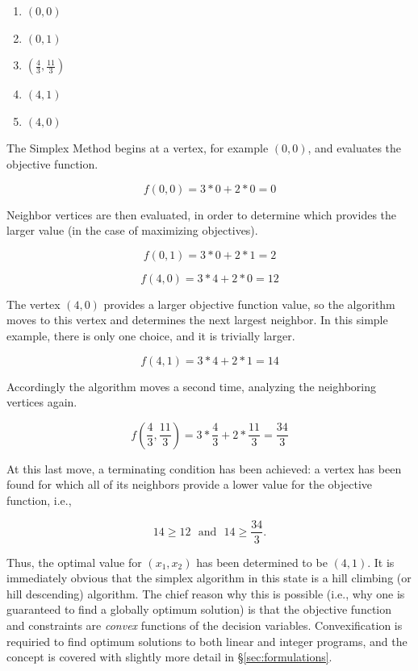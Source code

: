 \begin{enumerate}
  \item $(0, 0)$
  \item $(0, 1)$
  \item $(\frac{4}{3}, \frac{11}{3})$
  \item $(4, 1)$
  \item $(4, 0)$
\end{enumerate}

The Simplex Method begins at a vertex, for example $(0, 0)$, and evaluates the
objective function.

\begin{equation}
    f(0, 0) = 3 * 0 + 2 * 0 = 0 
\end{equation}

Neighbor vertices are then evaluated, in order to determine which provides the
larger value (in the case of maximizing objectives).

\begin{equation}
    f(0, 1) = 3 * 0 + 2 * 1 = 2 
\end{equation}

\begin{equation}
    f(4, 0) = 3 * 4 + 2 * 0 = 12 
\end{equation}

The vertex $(4, 0)$ provides a larger objective function value, so the algorithm
moves to this vertex and determines the next largest neighbor. In this simple
example, there is only one choice, and it is trivially larger.

\begin{equation}
    f(4, 1) = 3 * 4 + 2 * 1 = 14 
\end{equation}

Accordingly the algorithm moves a second time, analyzing the neighboring
vertices again.

\begin{equation}
    f(\frac{4}{3}, \frac{11}{3}) = 3 * \frac{4}{3} + 2 * \frac{11}{3} = \frac{34}{3} 
\end{equation}

At this last move, a terminating condition has been achieved: a vertex has been
found for which all of its neighbors provide a lower value for the objective
function, i.e.,

\begin{equation}
    14 \geq 12 \:\:\: \text{and} \:\:\: 14 \geq \frac{34}{3}.
\end{equation}

Thus, the optimal value for $(x_1, x_2)$ has been determined to be $(4, 1)$. It
is immediately obvious that the simplex algorithm in this state is a hill
climbing (or hill descending) algorithm. The chief reason why this is possible
(i.e., why one is guaranteed to find a globally optimum solution) is that the
objective function and constraints are \textit{convex} functions of the decision
variables. Convexification is requiried to find optimum solutions to both linear
and integer programs, and the concept is covered with slightly more detail
in \S \ref{sec:formulations}.

